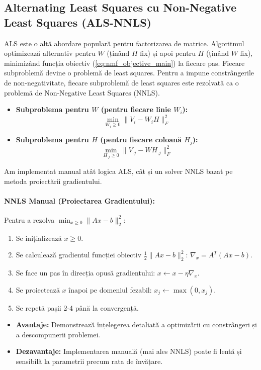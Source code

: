 \documentclass[12pt,a4paper]{article}
\begin{document}
\subsection{Alternating Least Squares cu Non-Negative Least Squares (ALS-NNLS)}
ALS este o altă abordare populară pentru factorizarea de matrice. Algoritmul optimizează alternativ pentru $W$ (ținând $H$ fix) și apoi pentru $H$ (ținând $W$ fix), minimizând funcția obiectiv (\ref{eq:nmf_objective_main}) la fiecare pas. Fiecare subproblemă devine o problemă de least squares. Pentru a impune constrângerile de non-negativitate, fiecare subproblemă de least squares este rezolvată ca o problemă de Non-Negative Least Squares (NNLS).
\begin{itemize}
\item \textbf{Subproblema pentru $W$ (pentru fiecare linie $W_i$):}
$$ \min_{W_i \ge 0} \| V_i - W_i H \|_F^2 $$
\item \textbf{Subproblema pentru $H$ (pentru fiecare coloană $H_j$):} %
$$ \min_{H_{\cdot j} \ge 0} \| V_{\cdot j} - W H_{\cdot j} \|_F^2 $$ 
\end{itemize}
Am implementat manual atât logica ALS, cât și un solver NNLS bazat pe metoda proiectării gradientului.
\paragraph{NNLS Manual (Proiectarea Gradientului):}
Pentru a rezolva $\min_{x \ge 0} \|Ax - b\|_2^2$:
\begin{enumerate}
\item Se inițializează $x \ge 0$.
\item Se calculează gradientul funcției obiectiv $\frac{1}{2}\|Ax - b\|_2^2$: $\nabla_x = A^T (Ax - b)$.
\item Se face un pas în direcția opusă gradientului: $x \leftarrow x - \eta \nabla_x$.
\item Se proiectează $x$ înapoi pe domeniul fezabil: $x_j \leftarrow \max(0, x_j)$.
\item Se repetă pașii 2-4 până la convergență.
\end{enumerate}
\begin{itemize}
\item \textbf{Avantaje:} Demonstrează înțelegerea detaliată a optimizării cu constrângeri și a descompunerii problemei.
\item \textbf{Dezavantaje:} Implementarea manuală (mai ales NNLS) poate fi lentă și sensibilă la parametrii precum rata de învățare.
\end{itemize}
\end{document}
